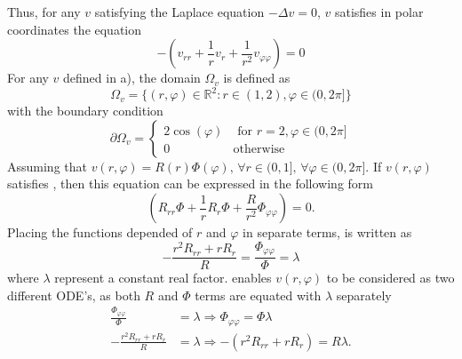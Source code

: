 Thus, for any $v$ satisfying the Laplace equation $-\Delta v = 0$, $v$ satisfies in polar coordinates the equation
\begin{equation}
	\label{eq:laplacePolar}
	-\left(v_{rr} + \frac{1}{r} v_r + \frac{1}{r^2} v_{\varphi\varphi}\right)=0
\end{equation}
%
For any $v$ defined in a), the domain $\Omega_v$ is defined as
\begin{equation}
	\Omega_v = \{(r,\varphi) \in \mathbb{R}^2 \colon r \in (1,2), \varphi \in (0, 2\pi]\}
\end{equation}
with the boundary condition 
\begin{equation}
	\partial \Omega_v =
	\begin{cases}
		2\cos{(\varphi)} &\text{ for } r = 2,  \varphi \in (0, 2\pi] \\
		0 &\text{otherwise}
	\end{cases}
\end{equation}
%
\newcommand{\constFac}{\lambda}
Assuming that $v(r,\varphi) = R(r)\Phi(\varphi) \text{, } \forall r \in (0,1] \text{, } \forall \varphi \in (0,2\pi]$.
If $v(r,\varphi)$ satisfies , then this equation can be expressed in the following form
\begin{equation}
	\label{eq:laplaceSep}
	\left(R_{rr} \Phi + \frac{1}{r} R_r \Phi + \frac{R}{r^2} \Phi_{\varphi\varphi}\right) = 0
	\text{.}
\end{equation}
Placing the functions depended of $r$ and $\varphi$ in separate terms,  is written as
\begin{equation}
	\label{eq:laplaceSep2}
	-\frac{r^2 R_{rr} + r R_r}{R} = \frac{\Phi_{\varphi\varphi}}{\Phi} = \constFac
\end{equation}
where $\constFac$ represent a constant real factor.
 enables $v(r,\varphi)$ to be considered as two different ODE's, as both $R$ and $\Phi$ terms are equated with $\constFac$ separately
%
\begin{align}
	\frac{\Phi_{\varphi\varphi}}{\Phi} &= \constFac \Rightarrow    \Phi_{\varphi\varphi} = \Phi \constFac \\ 
	-\frac{r^2 R_{rr} + r R_r}{R} &= \constFac      \Rightarrow   -\left(r^2 R_{rr} + r R_r \right) = R \constFac
	\text{.}
\end{align}
%

%
%

%

%
